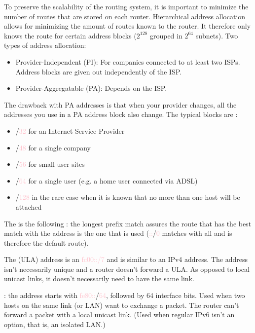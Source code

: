 To preserve the scalability of the routing system, it is important to minimize the number of routes that are stored on each router. Hierarchical address allocation allows for minimizing the amount of routes known to the router. It therefore only knows the route for certain address blocks ($2^{128}$ grouped in $2^{64}$ subnets).
Two types of address allocation:
\begin{itemize}
\item Provider-Independent (PI): For companies connected to at least two ISPs. Address blocks are given out independently of the ISP.
\item Provider-Aggregatable (PA): Depends on the ISP.
\end{itemize}

The drawback with PA addresses is that when your provider changes, all the addresses you use in a PA address block also change. The typical  blocks are :
\begin{itemize}
\item /\textcolor{pink}{32} for an Internet Service Provider
\item /\textcolor{pink}{48} for a single company
\item /\textcolor{pink}{56} for small user sites
\item /\textcolor{pink}{64} for a single user (e.g. a home user connected via ADSL)
\item /\textcolor{pink}{128} in the rare case when it is known that no more than one host will be attached
\end{itemize}

The  is the following : the longest prefix match assures the route that has the best match with the address is the one that is used (\textcolor{pink}{::}/\textcolor{pink}{0} matches with all and is therefore the default route).

The  (ULA) address is an \textcolor{pink}{fc00::/7} and is similar to an IPv4 address. The address isn’t necessarily unique and a router doesn’t forward a ULA. As opposed to local unicast links, it doesn’t necessarily need to have the same link.

 : the address starts with \textcolor{pink}{fe80::}/\textcolor{pink}{64}, followed by 64 interface bits. Used when two hosts on the same link (or LAN) want to exchange a packet. The router can’t forward a packet with a local unicast link. (Used when regular IPv6 isn’t an option, that is, an isolated LAN.)

